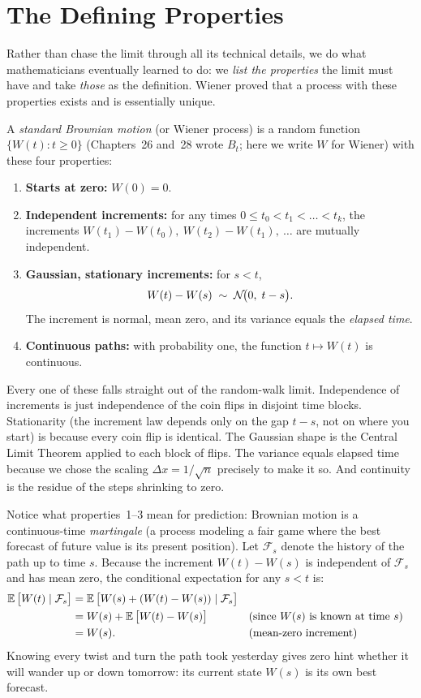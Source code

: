 \section{The Defining Properties}
\label{ch29:definition}

Rather than chase the limit through all its technical details, we do what
mathematicians eventually learned to do: we \emph{list the properties} the limit
must have and take \emph{those} as the definition. Wiener proved that a process
with these properties exists and is essentially unique.

\begin{definition}
\label{ch29:def-bm}
A \emph{standard Brownian motion} (or Wiener process) is a random function
$\{W(t): t\ge 0\}$ (Chapters~26 and~28 wrote $B_t$; here we write $W$ for Wiener) with these four properties:
\begin{enumerate}
  \item \textbf{Starts at zero:} $W(0) = 0$.
  \item \textbf{Independent increments:} for any times
  $0 \le t_0 < t_1 < \dots < t_k$, the increments
  $W(t_1)-W(t_0),\ W(t_2)-W(t_1),\ \dots$ are mutually independent.
  \item \textbf{Gaussian, stationary increments:} for $s<t$,
  \[
    W(t)-W(s) \;\sim\; \mathcal{N}\!\big(0,\; t-s\big).
  \]
  The increment is normal, mean zero, and its variance equals the
  \emph{elapsed time}.
  \item \textbf{Continuous paths:} with probability one, the function
  $t\mapsto W(t)$ is continuous.
\end{enumerate}
\end{definition}

Every one of these falls straight out of the random-walk limit. Independence of
increments is just independence of the coin flips in disjoint time blocks.
Stationarity (the increment law depends only on the gap $t-s$, not on where you
start) is because every coin flip is identical. The Gaussian shape is the Central
Limit Theorem applied to each block of flips. The variance equals elapsed time
because we chose the scaling $\Delta x = 1/\sqrt n$ precisely to make it so. And
continuity is the residue of the steps shrinking to zero.

Notice what properties~1--3 mean for prediction: Brownian motion is a
continuous-time \emph{martingale} (a process modeling a fair game where the best
forecast of future value is its present position). Let $\mathcal{F}_s$ denote the
history of the path up to time $s$. Because the increment $W(t)-W(s)$ is independent
of $\mathcal{F}_s$ and has mean zero, the conditional expectation for any $s < t$ is:
\begin{align*}
  \operatorname{\mathbb{E}}\big[W(t) \mid \mathcal{F}_s\big]
  &= \operatorname{\mathbb{E}}\big[W(s) + (W(t)-W(s)) \mid \mathcal{F}_s\big] \\
  &= W(s) + \operatorname{\mathbb{E}}\big[W(t)-W(s)\big] &&\text{(since } W(s) \text{ is known at time } s\text{)} \\
  &= W(s). &&\text{(mean-zero increment)}
\end{align*}
Knowing every twist and turn the path took yesterday gives zero hint whether it
will wander up or down tomorrow: its current state $W(s)$ is its own best forecast.

